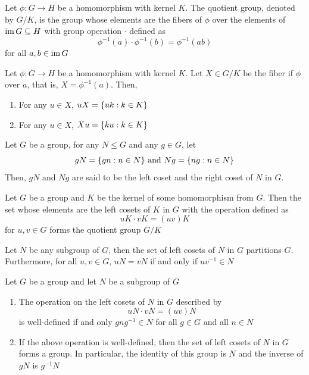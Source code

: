 \begin{definition}
	Let $\phi: G \to H$ be a homomorphism with kernel $K$. The quotient group, denoted by $G/K$, is the group whose elements are the fibers of $\phi$ over the elements of $\operatorname{im} G \subseteq H$ with group operation $\cdot$ defined as
	\[
	\phi^{-1}(a) \cdot \phi^{-1}(b) = \phi^{-1}(ab)
	\]
	for all $a, b \in \operatorname{im} G$
\end{definition}

\begin{proposition}
	Let $\phi: G \to H$ be a homomorphism with kernel $K$. Let $X \in G/K$ be the fiber if $\phi$ over $a$, that is, $X = \phi^{-1}(a)$. Then,
	\begin{enumerate}
		\item For any $u \in X$, $uX = \{uk: k \in K\}$
		\item For any $u \in X$, $Xu = \{ku: k \in K\}$
	\end{enumerate}
\end{proposition}

\begin{definition}[Coset]
	Let $G$ be a group, for any $N \leq G$ and any $g \in G$, let
	\[
	gN = \{gn: n \in N\} \text{ and } Ng = \{ng: n \in N\}
	\]
	Then, $gN$ and $Ng$ are said to be the left coset and the right coset of $N$ in $G$.
\end{definition}

\begin{theorem}
	Let $G$ be a group and $K$ be the kernel of some homomorphism from $G$. Then the set whose elements are the left cosets of $K$ in $G$ with the operation defined as
	\[
	uK \cdot vK = (uv)K
	\]
	for $u, v \in G$ forms the quotient group $G/K$
\end{theorem}

\begin{proposition}
	Let $N$ be any subgroup of $G$, then the set of left cosets of $N$ in $G$ partitions $G$. Furthermore, for all $u, v \in G$, $uN = vN$ if and only if $uv^{-1} \in N$
\end{proposition}


\begin{proposition}
	Let $G$ be a group and let $N$ be a subgroup of $G$
	\begin{enumerate}
		\item The operation on the left cosets of $N$ in $G$ described by
		\[
		uN \cdot vN = (uv) N
		\]
		is well-defined if and only $gng^{-1} \in N$ for all $g \in G$ and all $n \in N$
		\item If the above operation is well-defined, then the set of left cosets of $N$ in $G$ forms a group. In particular, the identity of this group is $N$ and the inverse of $gN$ is $g^{-1}N$
	\end{enumerate}
\end{proposition}

